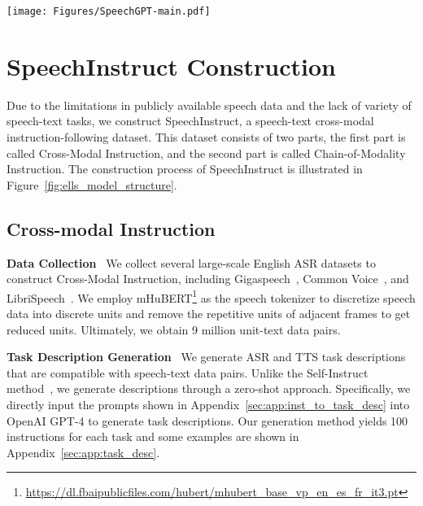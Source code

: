 \begin{figure*}[t] 
    \setlength{\abovecaptionskip}{-0.cm}
    \setlength{\belowcaptionskip}{-0.5cm}
    \centering 
    \texttt{[image: Figures/SpeechGPT-main.pdf]} 
    \captionsetup{skip=10pt}
    \caption{\textbf{Left}: An overview of SpeechInstruct construction process. The SpeechInstruct dataset consists of two parts: Cross-modal Instruction data and Chain-of-Modality Instruction data. $Template_{1}$ is shown in~\ref{sec:131_aligned_data}. $Template_{2}$ is shown in Appendix~\ref{sec:app:cot_isnt}. \textbf{Right}: An illustration of \method model structure.}
    \label{fig:ells_model_structure} 
\end{figure*}

\section{SpeechInstruct Construction}

Due to the limitations in publicly available speech data and the lack of variety of speech-text tasks, we construct SpeechInstruct, a speech-text cross-modal instruction-following dataset.
This dataset consists of two parts, the first part is called Cross-Modal Instruction, and the second part is called Chain-of-Modality Instruction. The construction process of SpeechInstruct is illustrated in Figure~\ref{fig:ells_model_structure}.

\subsection{Cross-modal Instruction }
\label{sec:131_aligned_data}

\noindent\textbf{Data Collection}~
We collect several large-scale English ASR datasets to construct Cross-Modal Instruction, including Gigaspeech~\citep{chen2021gigaspeech}, Common Voice~\citep{ardila2020common}, and LibriSpeech~\citep{librispeech}. We employ mHuBERT\footnote{\url{https://dl.fbaipublicfiles.com/hubert/mhubert_base_vp_en_es_fr_it3.pt}} as the speech tokenizer to discretize speech data into discrete units and  remove the repetitive units of adjacent frames
to get reduced units. Ultimately, we obtain 9 million unit-text data pairs.

\noindent\textbf{Task Description Generation}~
We generate ASR and TTS task descriptions that are compatible with speech-text data pairs. Unlike the Self-Instruct method~\citep{wang2022selfinstruct}, we generate descriptions through a zero-shot approach. Specifically, we directly input the prompts shown in Appendix~\ref{sec:app:inst_to_task_desc} into OpenAI GPT-4 to generate task descriptions. Our generation method yields 100 instructions for each task and some examples are shown in Appendix~\ref{sec:app:task_desc}.

